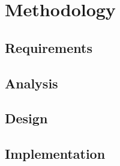 \chapter{Methodology}




\section{Requirements}



\section{Analysis}




\section{Design}



\section{Implementation}


